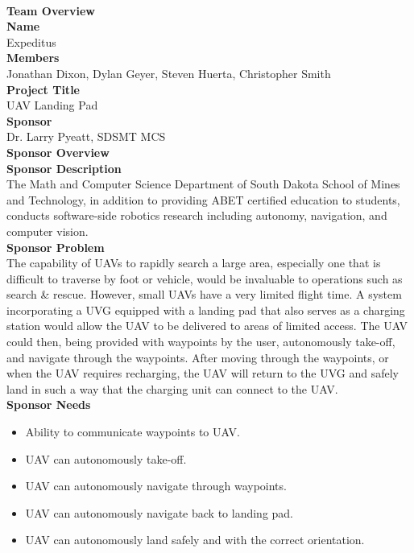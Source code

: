 \\
\Large{\textbf{Team Overview}}
\\[-3mm]\noindent\makebox[\linewidth]{\rule{\textwidth}{0.4pt}}
\Large{\textbf{Name}}
\\ Expeditus 
\\[3mm]
\Large{\textbf{Members}}
\\ Jonathan Dixon, Dylan Geyer, Steven Huerta, Christopher Smith
\\[3mm]
\Large{\textbf{Project Title}}
\\ UAV Landing Pad
\\[3mm]
\Large{\textbf{Sponsor}}
\\ Dr. Larry Pyeatt, SDSMT MCS
\\[10mm]
\Large{\textbf{Sponsor Overview}}
\\[-3mm]\noindent\makebox[\linewidth]{\rule{\textwidth}{0.4pt}}
\Large{\textbf{Sponsor Description}}
\\ The Math and Computer Science Department of South Dakota School of Mines and Technology, in addition to providing ABET certified education to students, conducts software-side robotics research including autonomy, navigation, and computer vision. 
\\[3mm]
\Large{\textbf{Sponsor Problem}}
\\ The capability of UAVs to rapidly search a large area, especially one that is difficult to traverse by foot or vehicle, would be invaluable to operations such as search \& rescue. However, small UAVs have a very limited flight time. A system incorporating a UVG equipped with a landing pad that also serves as a charging station would allow the UAV to be delivered to areas of limited access. The UAV could then, being provided with waypoints by the user, autonomously take-off, and navigate through the waypoints. After moving through the waypoints, or when the UAV requires recharging, the UAV will return to the UVG and safely land in such a way that the charging unit can connect to the UAV.
\\[3mm]
\Large{\textbf{Sponsor Needs}}
\begin{itemize}
\item Ability to communicate waypoints to UAV.
\item UAV can autonomously take-off.
\item UAV can autonomously navigate through waypoints.
\item UAV can autonomously navigate back to landing pad.
\item UAV can autonomously land safely and with the correct orientation.
\end{itemize}
